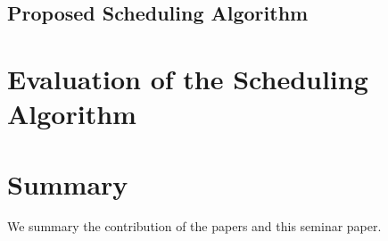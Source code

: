 \subsection{Proposed Scheduling Algorithm}



\section{Evaluation of the Scheduling Algorithm}








\section{Summary}
We summary the contribution of the papers and this seminar paper.
